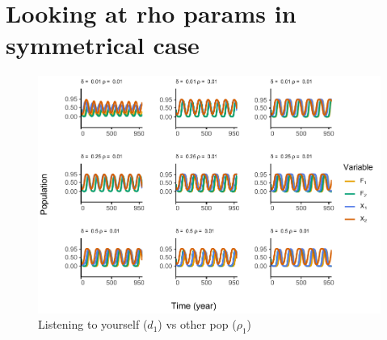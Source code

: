 \documentclass[
]{article}
\begin{document}
\newpage

\section{Looking at rho params in symmetrical case}\label{looking-at-rho-params-in-symmetrical-case}



\begin{figure}
\centering
\includegraphics{ReviewerMovementTest_files/figure-latex/influenceAsym-1.pdf}
\caption{\label{fig:influenceAsym}Listening to yourself (\(d_1\)) vs other pop (\(\rho_1\)) \label{influenceAsym}}
\end{figure}
\end{document}
